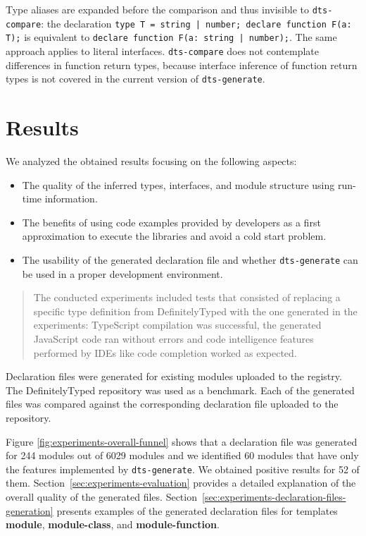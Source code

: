 \documentclass[english,cleveref,autoref,submission]{programming}
\begin{document}
Type aliases are expanded before the comparison and thus invisible to
\texttt{dts-compare}: the declaration
\lstinline{type T = string | number; declare function F(a: T);} is equivalent to
\lstinline{declare function F(a: string | number);}. The same approach applies to literal
interfaces. \texttt{dts-compare} does 
not contemplate differences in function return types, because interface inference of
function return types is not covered in the current version of \texttt{dts-generate}. 

\section{Results}
\label{sec:results}
We analyzed the obtained results focusing on the following aspects:
\begin{itemize}
  \item The quality of the inferred types, interfaces, and module structure using run-time information.
  \item The benefits of using code examples provided by developers as a first approximation to execute the libraries and avoid a cold start problem.
  \item The usability of the generated declaration file and whether \texttt{dts-generate} can be used in a proper development environment.
\end{itemize}

\begin{quotation}
  The conducted experiments included tests that consisted of replacing
  a specific type definition from DefinitelyTyped
  \cite{definitely-typed-repository} with the one generated in the
  experiments: TypeScript compilation was successful, the generated
  JavaScript code ran without errors and code intelligence features
  performed by IDEs like code completion worked as expected.
\end{quotation}

Declaration files were generated for existing modules uploaded to the
\NPM{} registry. The DefinitelyTyped repository was used as a
benchmark. Each of the generated files was compared against the
corresponding declaration file uploaded to the repository.

Figure \ref{fig:experiments-overall-funnel} shows that a declaration file was generated
for 244 modules out of 6029 modules and we identified 60 modules that have only the
features implemented by \texttt{dts-generate}. We obtained positive results for 52 of
them. Section~\ref{sec:experiments-evaluation} provides a detailed explanation of the overall
quality of the generated files.
Section~\ref{sec:experiments-declaration-files-generation} presents examples of the generated declaration files for
templates \textbf{module}, \textbf{module-class}, and \textbf{module-function}. 
\end{document}
